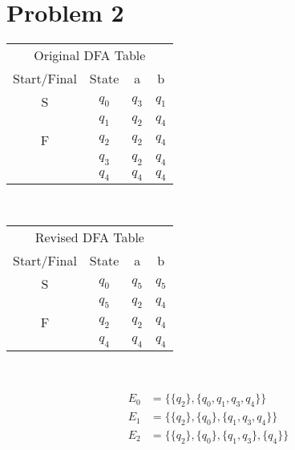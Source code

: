 \documentclass[12pt]{article}
\begin{document}
\section*{Problem 2}
\begin{multicols*}{2}
    \begin{tabular}{cc|c|c}
        \multicolumn{4}{c}{Original DFA Table} \\
        Start/Final & State & a & b \\
        S & \(q_0\) & \(q_3\) & \(q_1\) \\
        & \(q_1\) & \(q_2\) & \(q_4\) \\
        F & \(q_2\) & \(q_2\) & \(q_4\) \\
        & \(q_3\) & \(q_2\) & \(q_4\) \\
        & \(q_4\) & \(q_4\) & \(q_4\)
    \end{tabular} \\[1em]
    \begin{tabular}{cc|c|c}
        \multicolumn{4}{c}{Revised DFA Table} \\
        Start/Final & State & a & b \\
        S & \(q_0\) & \(q_5\) & \(q_5\) \\
        & \(q_5\) & \(q_2\) & \(q_4\) \\
        F & \(q_2\) & \(q_2\) & \(q_4\) \\
        & \(q_4\) & \(q_4\) & \(q_4\)
    \end{tabular} \\

    \columnbreak
    
    \begin{align*}
        E_0 & = \{\{q_2\}, \{q_0, q_1, q_3, q_4\}\} \\
        E_1 & = \{\{q_2\}, \{q_0\}, \{q_1, q_3, q_4\}\} \\
        E_2 & = \{\{q_2\}, \{q_0\}, \{q_1, q_3\}, \{q_4\}\} \\
    \end{align*} \\


\end{multicols*}
\end{document}
